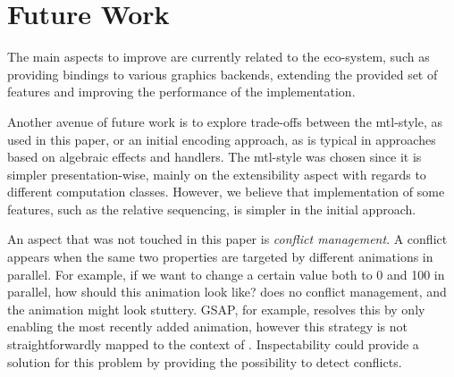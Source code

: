 \section{Future Work}
\label{sec:future}

The main aspects to improve are currently related to the \dsl{} eco-system, such as providing bindings to various graphics backends, extending the provided set of features and improving the performance of the implementation.

Another avenue of future work is to explore trade-offs between the mtl-style, as used in this paper, or an initial encoding approach, as is typical in approaches based on algebraic effects and handlers. The mtl-style was chosen since it is simpler presentation-wise, mainly on the extensibility aspect with regards to different computation classes. However, we believe that implementation of some features, such as the relative sequencing, is simpler in the initial approach.

An aspect that was not touched in this paper is \emph{conflict management}. A conflict appears when the same two properties are targeted by different animations in parallel. For example, if we want to change a certain value both to 0 and 100 in parallel, how should this animation look like? \dsl{} does no conflict management, and the animation might look stuttery. GSAP, for example, resolves this by only enabling the most recently added animation, however this strategy is not straightforwardly mapped to the context of \dsl{}. Inspectability could provide a solution for this problem by providing the possibility to detect conflicts.
